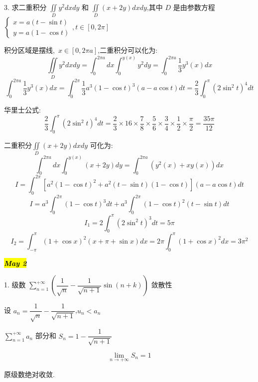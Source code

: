 3. 求二重积分 $\iint\limits_{D}y^2dxdy$ 和 $\iint\limits_{D}(x+2y)dxdy$,其中 $D$ 是由参数方程 $\left\lbrace\begin{array}{l}
	x=a(t-\sin t)\\y=a(1-\cos t)
\end{array} \right. ,t\in [0,2\pi]$
\begin{solution}
	
	积分区域是摆线,\ $x\in [0,2\pi a]$,二重积分可以化为: 
	$$\iint\limits_{D}y^2dxdy=\int_{0}^{2\pi a}dx\int_{0}^{y(x)}y^2dy=\int_{0}^{2\pi a}\frac{1}{3}y^{3}(x)dx$$
	$$\int_{0}^{2\pi a}\frac{1}{3}y^{3}(x)dx=\int_{0}^{2\pi }\frac{1}{3}a^3(1-\cos t)^3(a-a\cos t)dt=\frac{2}{3}\int_{0}^{\pi}(2\sin^2 t)^4dt$$
	
	华里士公式:  $$\frac{2}{3}\int_{0}^{\pi}(2\sin^2 t)^4dt=\frac{2}{3}\times 16\times\frac{7}{8}\times\frac{5}{6}\times\frac{3}{4}\times\frac{1}{2}\times\frac{\pi}{2}=\frac{35\pi}{12}$$
	
	二重积分$\iint\limits_{D}(x+2y)dxdy$ 可化为: 
	$$\int_{0}^{2\pi a}dx\int_{0}^{y(x)}(x+2y)dy=\int_{0}^{2\pi a}(y^{2}(x)+xy(x))dx$$
	$$I=\int_{0}^{2\pi }[a^2(1-\cos t)^2+a^2(t-\sin t)(1-\cos t)](a-a\cos t)dt$$
	$$I=a^3\int_{0}^{2\pi }(1-\cos t)^3dt+a^3\int_{0}^{2\pi }(1-\cos t)^2(t-\sin t)dt$$
	$$I_{1}=2\int_{0}^{\pi}(2\sin^2 t)^3dt=5\pi$$
	$$I_{2}=\int_{-\pi}^{\pi}(1+\cos x)^2(x+\pi+\sin x)dx=2\pi\int_{0}^{\pi}(1+\cos x)^2dx=3\pi^2$$
\end{solution}


\hl{\textbf{\textit{May 2}}}

1. 级数 $\sum\limits_{n=1}^{+\infty}(\dfrac{1}{\sqrt{n}}-\dfrac{1}{\sqrt{n+1}}\sin(n+k))$ 敛散性
\begin{solution}
	
	设 $a_{n}=\dfrac{1}{\sqrt{n}}-\dfrac{1}{\sqrt{n+1}}$,$u_{n}<a_{n}$
	
	$\sum\limits_{n=1}^{+\infty}a_{n}$ 部分和 $S_{n}=1-\dfrac{1}{\sqrt{n+1}}$
	
	$$\lim\limits_{n\rightarrow +\infty}S_{n}=1$$
	
	原级数绝对收敛.
\end{solution}


